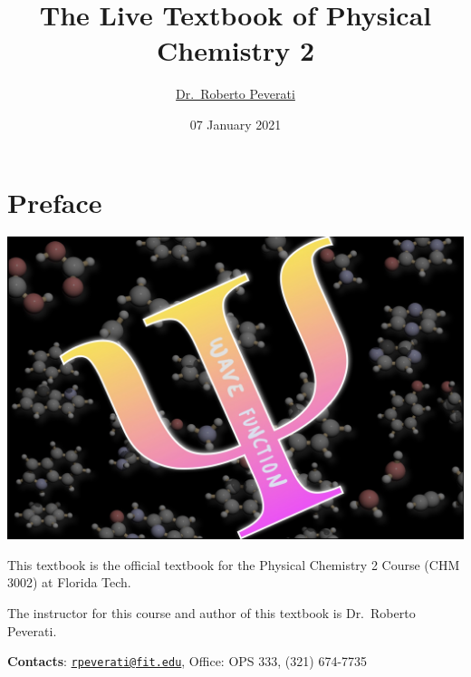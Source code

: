 \documentclass[
  9pt,
]{extbook}
\title{The Live Textbook of Physical Chemistry 2}
\author{\href{mailto:rpeverati@fit.edu}{Dr.~Roberto Peverati}}
\date{07 January 2021}
\let\oldmaketitle\maketitle
\begin{document}
\maketitle


%
\newpage

\let\maketitle\oldmaketitle

\renewcommand\thepage{\romannumeral\numexpr\value{page}-1\relax}


{
\setcounter{tocdepth}{1}
\tableofcontents
}
\renewcommand{\arraystretch}{1.8}

\hypertarget{preface}{%
\chapter*{Preface}\label{preface}}

\begin{center}\includegraphics[width=0.8\linewidth]{./img/OEP_Figures.000} \end{center}

This textbook is the official textbook for the Physical Chemistry 2 Course (CHM 3002) at Florida Tech.

The instructor for this course and author of this textbook is Dr.~Roberto Peverati.

\textbf{Contacts}: \href{mailto:rpeverati@fit.edu}{\nolinkurl{rpeverati@fit.edu}}, Office: OPS 333, (321) 674-7735
\end{document}
